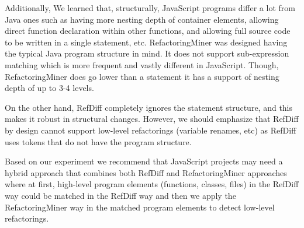 \documentclass[letterpaper,12pt,onecolumn,final]{report}
\begin{document}
Additionally, We learned that, structurally, JavaScript programs differ a lot from Java ones such as having more nesting depth of container elements, allowing direct function declaration within other functions, and allowing full source code to be written in a single statement, etc. RefactoringMiner was designed having the typical Java program structure in mind. It does not support sub-expression matching which is more frequent and vastly different in JavaScript. Though, RefactoringMiner does go lower than a statement it has a support of nesting depth of up to 3-4 levels.

On the other hand, RefDiff completely ignores the statement structure, and this makes it robust in structural changes. However, we should emphasize that RefDiff by design cannot support low-level refactorings (variable renames, etc) as RefDiff uses tokens that do not have the program structure.

Based on our experiment we recommend that JavaScript projects may need a hybrid approach that combines both RefDiff and RefactoringMiner approaches where at first, high-level program elements (functions, classes, files) in the RefDiff way could be matched in the RefDiff way and then we apply the RefactoringMiner way in the matched program elements to detect low-level refactorings.

\clearpage
{}
{}  %
\singlespacing %





\appendix
\setcounter{table}{0}		%
\setcounter{figure}{0}		%
\renewcommand{\thefigure}{\Alph{chapter}.\arabic{figure}} 	%
\renewcommand{\thetable}{\Alph{chapter}.\arabic{table}}		%
\end{document}
